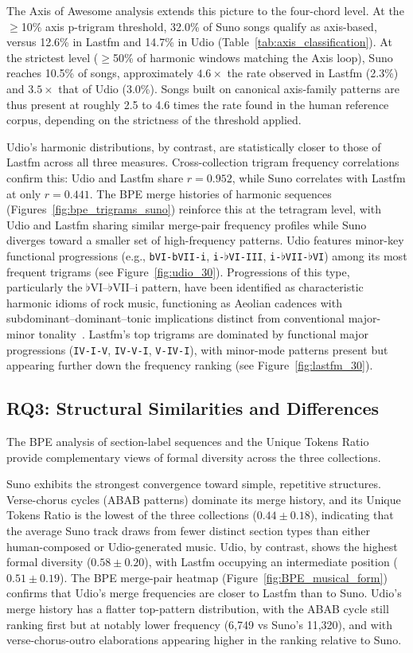 \documentclass{article}
\begin{document}
The Axis of Awesome analysis extends this picture to the four-chord level. At the $\geq$10\% axis p-trigram threshold, 32.0\% of Suno songs qualify as axis-based, versus 12.6\% in Lastfm and 14.7\% in Udio (Table~\ref{tab:axis_classification}). At the strictest level ($\geq$50\% of harmonic windows matching the Axis loop), Suno reaches 10.5\% of songs, approximately $4.6\times$ the rate observed in Lastfm (2.3\%) and $3.5\times$ that of Udio (3.0\%). Songs built on canonical axis-family patterns are thus present at roughly 2.5 to 4.6 times the rate found in the human reference corpus, depending on the strictness of the threshold applied.

Udio's harmonic distributions, by contrast, are statistically closer to those of Lastfm across all three measures. Cross-collection trigram frequency correlations confirm this: Udio and Lastfm share $r = 0.952$, while Suno correlates with Lastfm at only $r = 0.441$. The BPE merge histories of harmonic sequences (Figures~\ref{fig:bpe_trigrams_suno}) reinforce this at the tetragram level, with Udio and Lastfm sharing similar merge-pair frequency profiles while Suno diverges toward a smaller set of high-frequency patterns. Udio features minor-key functional progressions (e.g., \texttt{bVI-bVII-i}, \texttt{i-$\flat$VI-III}, \texttt{i-$\flat$VII-$\flat$VI}) among its most frequent trigrams (see Figure~\ref{fig:udio_30}). Progressions of this type, particularly the $\flat$VI--$\flat$VII--i pattern, have been identified as characteristic harmonic idioms of rock music, functioning as Aeolian cadences with subdominant--dominant--tonic implications distinct from conventional major-minor tonality~\citep{biamonte2010triadic}. Lastfm's top trigrams are dominated by functional major progressions (\texttt{IV-I-V}, \texttt{IV-V-I}, \texttt{V-IV-I}), with minor-mode patterns present but appearing further down the frequency ranking (see Figure~\ref{fig:lastfm_30}).

\subsection{RQ3: Structural Similarities and Differences}
\label{sec:disc_structure}

The BPE analysis of section-label sequences and the Unique Tokens Ratio provide complementary views of formal diversity across the three collections.

Suno exhibits the strongest convergence toward simple, repetitive structures. Verse-chorus cycles (ABAB patterns) dominate its merge history, and its Unique Tokens Ratio is the lowest of the three collections ($0.44 \pm 0.18$), indicating that the average Suno track draws from fewer distinct section types than either human-composed or Udio-generated music. Udio, by contrast, shows the highest formal diversity ($0.58 \pm 0.20$), with Lastfm occupying an intermediate position ($0.51 \pm 0.19$). The BPE merge-pair heatmap (Figure~\ref{fig:BPE_musical_form}) confirms that Udio's merge frequencies are closer to Lastfm than to Suno. Udio's merge history has a flatter top-pattern distribution, with the ABAB cycle still ranking first but at notably lower frequency (6,749 vs Suno's 11,320), and with verse-chorus-outro elaborations appearing higher in the ranking relative to Suno.
\end{document}
